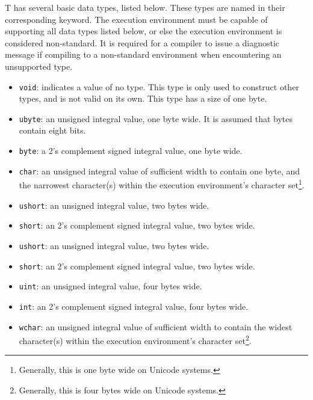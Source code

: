 \documentclass[letterpaper,12pt]{book}
\begin{document}
T has several basic data types, listed below. These types are named in their corresponding keyword. The execution environment must be capable of supporting all data types listed below, or else the execution environment is considered non-standard. It is required for a compiler to issue a diagnostic message if compiling to a non-standard environment when encountering an unsupported type.

\begin{itemize}
	\item \texttt{void}: indicates a value of no type. This type is only used to construct other types, and is not valid on its own. This type has a size of one byte.
	
	\item \texttt{ubyte}: an unsigned integral value, one byte wide. It is assumed that bytes contain eight bits.
	
	\item \texttt{byte}: a 2's complement signed integral value, one byte wide.
	
	\item \texttt{char}: an unsigned integral value of sufficient width to contain one byte, and the narrowest character(s) within the execution environment's character set\footnote{Generally, this is one byte wide on Unicode systems.}.
	
	\item \texttt{ushort}: an unsigned integral value, two bytes wide.
	
	\item \texttt{short}: an 2's complement signed integral value, two bytes wide.
	
	\item \texttt{ushort}: an unsigned integral value, two bytes wide.
	
	\item \texttt{short}: an 2's complement signed integral value, two bytes wide.
	
	\item \texttt{uint}: an unsigned integral value, four bytes wide.
	
	\item \texttt{int}: an 2's complement signed integral value, four bytes wide.
	
	\item \texttt{wchar}: an unsigned integral value of sufficient width to contain the widest character(s) within the execution environment's character set\footnote{Generally, this is four bytes wide on Unicode systems.}.
	

\end{itemize}
\end{document}
